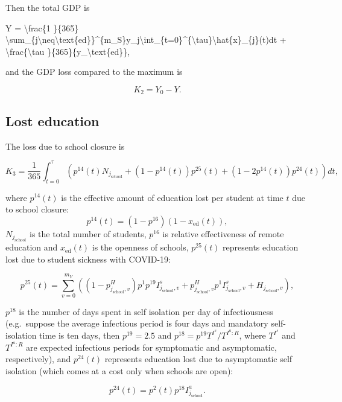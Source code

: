 \documentclass[
]{article}
\newenvironment{Shaded}{\begin{snugshade}}{\end{snugshade}}
\newcommand{\NormalTok}[1]{#1}
\begin{document}
Then the total GDP is

\begin{Shaded}
\begin{Highlighting}[]
\NormalTok{Y =  \textbackslash{}frac\{1 \}\{365\} \textbackslash{}sum\_\{j\textbackslash{}neq\textbackslash{}text\{ed\}\}\^{}\{m\_S\}y\_j\textbackslash{}int\_\{t=0\}\^{}\{\textbackslash{}tau\}\textbackslash{}hat\{x\}\_\{j\}(t)dt + \textbackslash{}frac\{\textbackslash{}tau \}\{365\}\{y\_\textbackslash{}text\{ed\}\},}
\end{Highlighting}
\end{Shaded}

and the GDP loss compared to the maximum is

\[K_2=Y_0-Y.\]

\subsection{Lost education}\label{lost-education}

The loss due to school closure is

\[K_3 =  \frac{1 }{365} \int_{t=0}^{\tau}\left(p^{14}(t)N_{j_{\text{school}}} + (1-p^{14}(t))p^{25}(t)  +(1-2p^{14}(t))p^{24}(t)\right)dt,\]

where \(p^{14}(t)\) is the effective amount of education lost per student at time \(t\) due to school closure:
\[p^{14}(t) = (1-p^{16})(1-x_{\text{ed}}(t)),\]
\(N_{j_{\text{school}}}\) is the total number of students, \(p^{16}\) is relative effectiveness of remote education and \(x_{\text{ed}}(t)\) is the openness of schools, \(p^{25}(t)\) represents education lost due to student sickness with COVID-19:

\[p^{25}(t)=\sum_{v=0}^{m_V}\left((1-p^H_{j_{\text{school}},v})p^1p^{19}I_{j_{\text{school}},v}^{s}+p^H_{j_{\text{school}},v}p^1I_{j_{\text{school}},v}^{s}+H_{j_{\text{school}},v}\right),\]

\(p^{18}\) is the number of days spent in self isolation per day of infectiousness (e.g.~suppose the average infectious period is four days and mandatory self-isolation time is ten days, then \(p^{19}=2.5\) and \(p^{18}=p^{19}T^{I^s}/T^{I^a:R}\), where \(T^{I^s}\) and \(T^{I^a:R}\) are expected infectious periods for symptomatic and asymptomatic, respectively), and \(p^{24}(t)\) represents education lost due to asymptomatic self isolation (which comes at a cost only when schools are open):

\[p^{24}(t)=p^2(t)p^{18}I_{j_{\text{school}}}^{a}.\]
\end{document}

